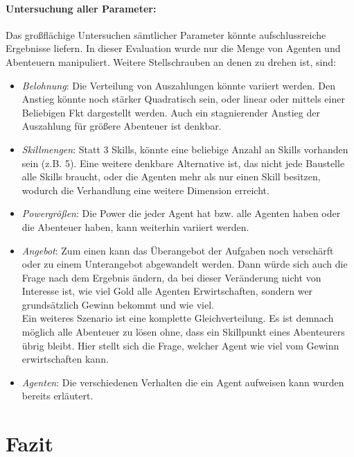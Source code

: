 \documentclass[fleqn,10pt]{SelfArx} %
\begin{document}
\paragraph{Untersuchung aller Parameter:}
Das großflächige Untersuchen sämtlicher Parameter könnte aufschlussreiche Ergebnisse liefern. In dieser Evaluation wurde nur die Menge von Agenten und Abenteuern manipuliert. Weitere Stellschrauben an denen zu drehen ist, sind:
\begin{itemize}
	\item \textit{Belohnung}: Die Verteilung von Auszahlungen könnte variiert werden. Den Anstieg könnte noch stärker Quadratisch sein, oder linear oder mittels einer Beliebigen Fkt dargestellt werden. Auch ein stagnierender Anstieg der Auszahlung für größere Abenteuer ist denkbar.
	\item \textit{Skillmengen}: Statt 3 Skills, könnte eine beliebige Anzahl an Skills vorhanden sein (z.B. 5). Eine weitere denkbare Alternative ist, das nicht jede Baustelle alle Skills braucht, oder die Agenten mehr als nur einen Skill besitzen, wodurch die Verhandlung eine weitere Dimension erreicht. 
	\item \textit{Powergrößen}: Die Power die jeder Agent hat bzw. alle Agenten haben oder die Abenteuer haben, kann weiterhin variiert werden.
	\item \textit{Angebot}: Zum einen kann das Überangebot der Aufgaben noch verschärft oder zu einem Unterangebot abgewandelt werden. Dann würde sich auch die Frage nach dem Ergebnis ändern, da bei dieser Veränderung nicht von Interesse ist, wie viel Gold alle Agenten Erwirtschaften, sondern wer grundsätzlich Gewinn bekommt und wie viel. \\
	Ein weiteres Szenario ist eine komplette Gleichverteilung. Es ist demnach möglich alle Abenteuer zu lösen ohne, dass ein Skillpunkt eines Abenteurers übrig bleibt. Hier stellt sich die Frage, welcher Agent wie viel vom Gewinn erwirtschaften kann.
	\item \textit{Agenten}: Die verschiedenen Verhalten die ein Agent aufweisen kann wurden bereits erläutert.
\end{itemize}




\section{Fazit}
\label{sec:Conclusion}






\end{document}

